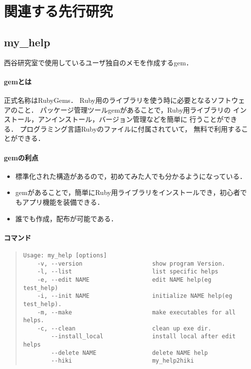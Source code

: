 \section{関連する先行研究}
\subsection{my\_help}
西谷研究室で使用しているユーザ独自のメモを作成するgem．

\paragraph{gemとは}
\begin{description}
\item 正式名称はRubyGems．
Ruby用のライブラリを使う時に必要となるソフトウェアのこと\cite{c}．
パッケージ管理ツールgemがあることで，Ruby用ライブラリの
インストール，アンインストール，バージョン管理などを簡単に
行うことができる．
プログラミング言語Rubyのファイルに付属されていて，
無料で利用することができる．
\end{description}

\paragraph{gemの利点}
\begin{itemize}
\item 標準化された構造があるので，初めてみた人でも分かるようになっている．
\item gemがあることで，簡単にRuby用ライブラリをインストールでき，初心者でもアプリ機能を装備できる．
\item 誰でも作成，配布が可能である．
\end{itemize}

\paragraph{コマンド}
\begin{description}
\item 
\end{description}
\begin{quote}\begin{verbatim}
Usage: my_help [options]
    -v, --version                    show program Version.
    -l, --list                       list specific helps
    -e, --edit NAME                  edit NAME help(eg test_help)
    -i, --init NAME                  initialize NAME help(eg test_help).
    -m, --make                       make executables for all helps.
    -c, --clean                      clean up exe dir.
        --install_local              install local after edit helps
        --delete NAME                delete NAME help
        --hiki                       my_help2hiki
\end{verbatim}\end{quote}

